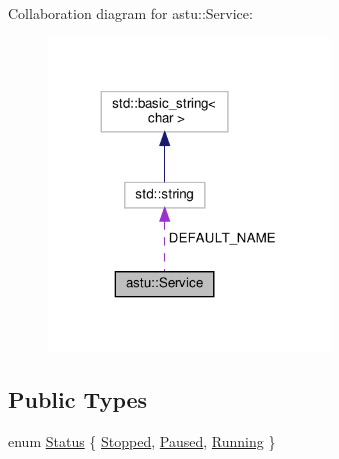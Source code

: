 Collaboration diagram for astu\+:\+:Service\+:
\nopagebreak
\begin{figure}[H]
\begin{center}
\leavevmode
\includegraphics[width=212pt]{classastu_1_1Service__coll__graph}
\end{center}
\end{figure}
\subsection*{Public Types}
\begin{DoxyCompactItemize}
\item 
enum \hyperlink{classastu_1_1Service_a5ef3b0bb1fb8a504afe708ee4dd8371e}{Status} \{ \hyperlink{classastu_1_1Service_a5ef3b0bb1fb8a504afe708ee4dd8371ea540be62ed0d93807434c4aead2df4403}{Stopped}, 
\hyperlink{classastu_1_1Service_a5ef3b0bb1fb8a504afe708ee4dd8371eab7d0f17617156ca782dda5cdf218e536}{Paused}, 
\hyperlink{classastu_1_1Service_a5ef3b0bb1fb8a504afe708ee4dd8371ea76f0ad4a03398154d25817e5aae795c0}{Running}
 \}
\end{DoxyCompactItemize}
